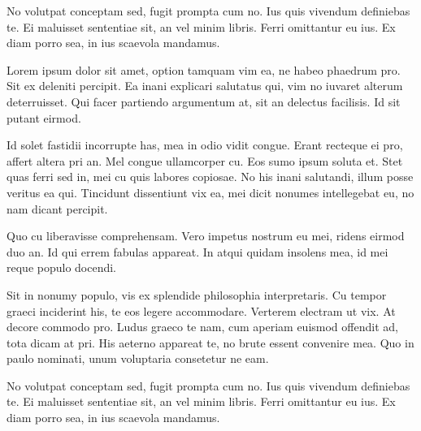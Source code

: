 No volutpat conceptam sed, fugit prompta cum no. Ius quis vivendum definiebas te. Ei maluisset sententiae sit, an vel minim libris. Ferri omittantur eu ius. Ex diam porro sea, in ius scaevola mandamus.

Lorem ipsum dolor sit amet, option tamquam vim ea, ne habeo phaedrum pro. Sit ex deleniti percipit. Ea inani explicari salutatus qui, vim no iuvaret alterum deterruisset. Qui facer partiendo argumentum at, sit an delectus facilisis. Id sit putant eirmod.

Id solet fastidii incorrupte has, mea in odio vidit congue. Erant recteque ei pro, affert altera pri an. Mel congue ullamcorper cu. Eos sumo ipsum soluta et. Stet quas ferri sed in, mei cu quis labores copiosae. No his inani salutandi, illum posse veritus ea qui. Tincidunt dissentiunt vix ea, mei dicit nonumes intellegebat eu, no nam dicant percipit.

Quo cu liberavisse comprehensam. Vero impetus nostrum eu mei, ridens eirmod duo an. Id qui errem fabulas appareat. In atqui quidam insolens mea, id mei reque populo docendi.

Sit in nonumy populo, vis ex splendide philosophia interpretaris. Cu tempor graeci inciderint his, te eos legere accommodare. Verterem electram ut vix. At decore commodo pro. Ludus graeco te nam, cum aperiam euismod offendit ad, tota dicam at pri. His aeterno appareat te, no brute essent convenire mea. Quo in paulo nominati, unum voluptaria consetetur ne eam.

No volutpat conceptam sed, fugit prompta cum no. Ius quis vivendum definiebas te. Ei maluisset sententiae sit, an vel minim libris. Ferri omittantur eu ius. Ex diam porro sea, in ius scaevola mandamus.